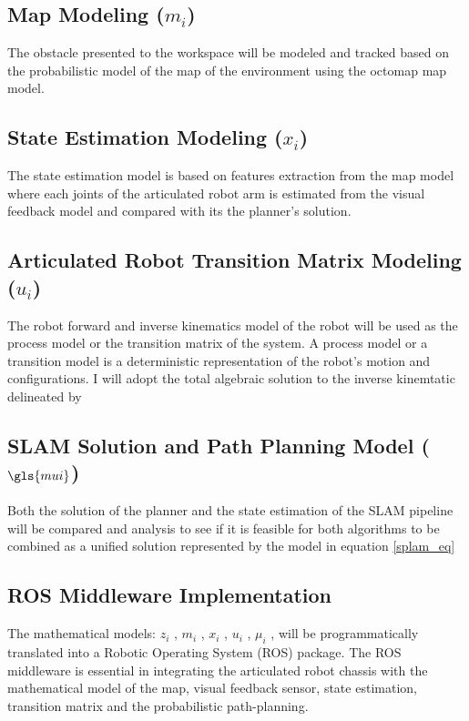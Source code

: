\subsection{Map Modeling ($m_i$)}\label{map_modeling_methodology}
The obstacle presented to the workspace will be modeled and tracked based on the probabilistic model of
the map of the environment using the octomap map model. 

\subsection{State Estimation Modeling ($x_i$)}\label{state_estimation_methodology}
The state estimation model is based on features extraction from the map model where each joints of the
articulated robot arm is estimated from the visual feedback model and compared with its the planner's solution.

\subsection{Articulated Robot Transition Matrix Modeling ($u_i$)}\label{transition_matrix_methodology}
The robot forward and inverse kinematics model of the robot will be used as the process model or the
transition matrix of the system. A process model or a transition model is a deterministic representation of
the robot’s motion and configurations. I
will adopt the total algebraic solution to the inverse kinemtatic delineated by \textcite{Pires2007}

\subsection{SLAM Solution and Path Planning Model ($\gls{mui}$)}\label{path_planning_methodology}
Both the solution of the planner and the state estimation of the SLAM pipeline will be compared and analysis to see if it is feasible 
for both algorithms to be combined as a unified solution represented by the
model in equation \ref{splam_eq}

\subsection{ROS Middleware Implementation}\label{implementation_methodology}
The mathematical models: $z_i$ , $m_i$ , $x_i$ , $u_i$ , $\mu_i$ , will be programmatically translated into a Robotic Operating
System (ROS) package. The ROS middleware is essential in integrating the articulated robot chassis
with the mathematical model of the map, visual feedback sensor, state estimation, transition matrix and
the probabilistic path-planning.


